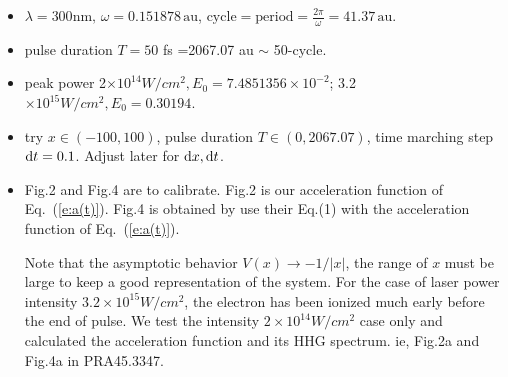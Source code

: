 \documentclass{isildur}
\begin{document}
\begin{itemize}

  \item $\lambda=300\mathrm{nm}, \,\omega=0.151878 \,\mathrm{au}$,
  $\mathrm{cycle} = \mathrm{period} = \frac{2\pi}{\omega} = 41.37
  \,\mathrm{au}$.

  \item pulse duration $T=50$ fs =2067.07 au $\sim$ 50-cycle.

  \item peak power 2$\times 10^{14}W/cm^2, E_0=7.4851356\times 10^{-2}$;
  3.2$\times 10^{15}W/cm^2, E_0=0.30194$.

  \item try $x\in (-100,100)$, pulse duration  $T \in (0,2067.07)$, time
  marching step $\mathop{}\!\mathrm{d} t=0.1$.  Adjust later for $\mathop{}\!\mathrm{d} x, \mathop{}\!\mathrm{d} t$.

  \item Fig.2 and Fig.4 are to calibrate.  Fig.2 is our acceleration function
  of Eq.~(\ref{e:a(t)}).  Fig.4 is obtained by use their Eq.(1) with the
  acceleration function of Eq.~(\ref{e:a(t)}).

Note that the asymptotic behavior $V(x)\rightarrow -1/|x|$, the range of $x$
must be large to keep a good representation of the system. For the case of
laser power intensity $3.2\times 10^{15} W/cm^2$, the electron has been ionized
much early before the end of pulse. We test the intensity $2\times 10^{14}
W/cm^2$ case only and calculated the acceleration function and its HHG
spectrum. ie, Fig.2a and Fig.4a in PRA45.3347.


\end{itemize}
\end{document}
